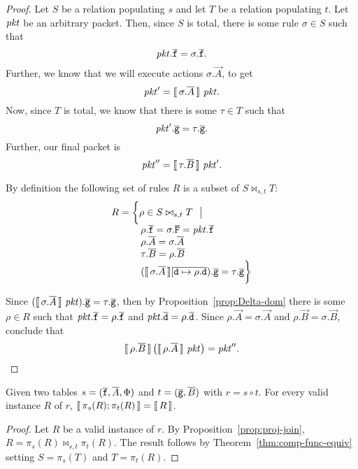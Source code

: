 \begin{proof}
  Let $S$ be a relation populating $s$ and let $T$ be a relation
  populating $t$.
  Let $\mathit{pkt}$ be an arbitrary packet. Then, since $S$ is total, there
  is some rule $\sigma \in S$ such that
  \[\mathit{pkt}.\overline{\texttt{f}} = \sigma.\overline{\texttt{f}}.\] Further, we know that
  we will execute actions $\sigma.\vec A$, to get
  \[\mathit{pkt}' = \llbracket\,\sigma.\overline{A}\,\rrbracket~\mathit{pkt}.\] Now, since $T$ is total, we know
  that there is some $\tau \in T$ such that
  \[\mathit{pkt}'.\overline{\texttt{g}} = \tau.\overline{\texttt{g}}.\] Further, our final
  packet is \[\mathit{pkt}'' = \llbracket\,\tau.\overline{B}\,\rrbracket~\mathit{pkt}'.\]

  By definition the following set of rules $R$ is a subset of $S \bowtie_{s,t}T$:
  \[\begin{array}{l}
      R  = \bigg\{\rho \in S \bowtie_{s,t} T~~\big|\\
      \qquad\quad \rho.\overline{\texttt{f}} = \sigma.\overline{\texttt{F}} = \mathit{pkt}.\overline{\texttt{f}}\\
      \qquad\quad \rho.\overline{A} = \sigma.\overline{A} \\
      \qquad\quad \tau.\overline{B} = \rho.\overline{B} \\
      \qquad\quad (\llbracket\,\sigma.\overline{A}\,\rrbracket[\overline{\texttt{d} \mapsto \rho.\texttt{d}}).\overline{\texttt{g}} =\tau.\overline{ \texttt{g}} \bigg\}
    \end{array}\]

  Since $(\llbracket\,\sigma.\overline{A}\,\rrbracket~\mathit{pkt}).\overline{\texttt{g}} = \tau.\overline{\texttt{g}}$, then by 
  Proposition~\ref{prop:Delta-dom} there is some $\rho \in R$ such
  that $\mathit{pkt}.\overline{\texttt{f}} = \rho.\overline{\texttt{f}}$ and $\mathit{pkt}.\overline{\texttt{d}} =
  \rho.\overline{\texttt{d}}$. Since $\rho.\vec A = \sigma.\vec A$ and
  $\rho.\vec B = \sigma.\vec B$, conclude that
  \[\llbracket\,\rho.\overline{B}\,\rrbracket\left(\llbracket\,\rho.\overline{A}\,\rrbracket~\mathit{pkt}\right) = \mathit{pkt}''.\]
\end{proof}


\begin{theorem}
  \label{thm:decomp-func-equiv}
  Given two tables $s = (\overline{\texttt{f}},\overline{A},\Phi)$ and
  $t = (\overline{\texttt{g}},\overline{B})$ with $r = s \circ t$. For every valid
  instance $R$ of $r$,
  $\llbracket\,\pi_s(R);\pi_t(R)\,\rrbracket = \llbracket\,R\,\rrbracket$.
\end{theorem}


\begin{proof}
  Let $R$ be a valid instance of $r$. By
  Proposition~\ref{prop:proj-join},
  $R = \pi_s(R)\bowtie_{s,t}\pi_t(R)$. The result follows by
  Theorem~\ref{thm:comp-func-equiv} setting $S = \pi_s(T)$ and
  $T=\pi_t(R)$.
\end{proof}


